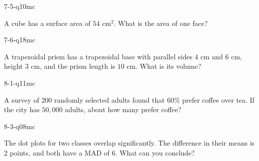\begin{practiceQuestion}{7-5-q10}{mc}
\begin{questionText}
A cube has a surface area of $54$ cm$^2$. What is the area of one face?
\end{questionText}
\end{practiceQuestion}

\begin{practiceQuestion}{7-6-q18}{mc}
\begin{questionText}
A trapezoidal prism has a trapezoidal base with parallel sides $4$ cm and $6$ cm, height $3$ cm, and the prism length is $10$ cm. What is its volume?
\end{questionText}
\end{practiceQuestion}

\begin{practiceQuestion}{8-1-q11}{mc}
\begin{questionText}
A survey of $200$ randomly selected adults found that $60\%$ prefer coffee over tea. If the city has $50{,}000$ adults, about how many prefer coffee?
\end{questionText}
\end{practiceQuestion}

\begin{practiceQuestion}{8-3-q08}{mc}
\begin{questionText}
The dot plots for two classes overlap significantly. The difference in their means is $2$ points, and both have a MAD of $6$. What can you conclude?
\end{questionText}
\end{practiceQuestion}

